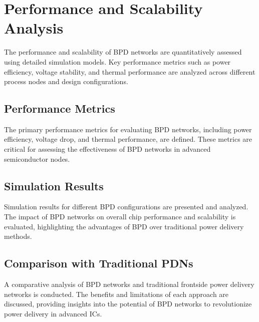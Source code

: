 \section{Performance and Scalability Analysis}
The performance and scalability of BPD networks are quantitatively assessed using detailed simulation models. Key performance metrics such as power efficiency, voltage stability, and thermal performance are analyzed across different process nodes and design configurations.

\subsection{Performance Metrics}
The primary performance metrics for evaluating BPD networks, including power efficiency, voltage drop, and thermal performance, are defined. These metrics are critical for assessing the effectiveness of BPD networks in advanced semiconductor nodes.

\subsection{Simulation Results}
Simulation results for different BPD configurations are presented and analyzed. The impact of BPD networks on overall chip performance and scalability is evaluated, highlighting the advantages of BPD over traditional power delivery methods.

\subsection{Comparison with Traditional PDNs}
A comparative analysis of BPD networks and traditional frontside power delivery networks is conducted. The benefits and limitations of each approach are discussed, providing insights into the potential of BPD networks to revolutionize power delivery in advanced ICs.
